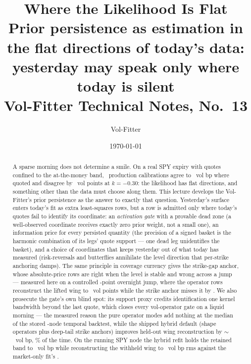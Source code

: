 \documentclass[11pt]{article}
\title{\textbf{Where the Likelihood Is Flat}\\[2pt]
\large Prior persistence as estimation in the flat directions of today's
data: yesterday may speak only where today is silent\\[2pt]
\normalsize Vol-Fitter Technical Notes, No.~13}
\author{Vol-Fitter}
\date{\today}
\begin{document}
\maketitle



\begin{abstract}
A sparse morning does not determine a smile.  On a real SPY expiry with
quotes confined to the at-the-money band, \pflnfits\ production
calibrations agree to \pflspreadatmbp\ vol bp where quoted and disagree
by \pflspreadwing\ vol points at $k=-0.30$: the likelihood has flat
directions, and something other than the data must choose along them.
This lecture develops the Vol-Fitter's prior persistence as the answer
to exactly that question.  Yesterday's surface enters today's fit as
extra least-squares rows, but a row is admitted only where today's
quotes fail to identify its coordinate: an \emph{activation gate} with
a provable dead zone (a well-observed coordinate receives exactly zero
prior weight, not a small one), an information price for every
persisted quantity (the precision of a signed basket is the harmonic
combination of its legs' quote support --- one dead leg unidentifies
the basket), and a choice of coordinates that keeps yesterday out of
what today has measured (risk-reversals and butterflies annihilate the
level direction that per-strike anchoring damps).  The same
principle in coverage currency gives the strike-gap anchor, whose
absolute-price rows are right when the level is stable and wrong
across a jump --- measured here on a controlled \pfljump-point
overnight jump, where the operator rows reconstruct the lifted wing to
\pflopwingerrdeep\ vol points while the strike anchor misses it by
\pflsgwingerrdeep.  We also prosecute the gate's own blind spot: its
support proxy credits identification one kernel bandwidth beyond the
last quote, which closes every vol-operator gate on a liquid morning
--- the measured reason the pure operator modes add nothing at the
median of the stored \pflbtnodes-node temporal backtest, while the
shipped hybrid default (shape operators plus deep-tail strike anchors)
improves held-out wing reconstruction by $\sim$\pflhybimpr\ vol bp,
\pflhybwin\% of the time.  On the running SPY node the hybrid refit
holds the retained band to \pflspybandrms\ vol bp while reconstructing
the withheld wing to \pflspywinghy\ vol bp rms against the market-only
fit's \pflspywingmo.
\end{abstract}
\end{document}

